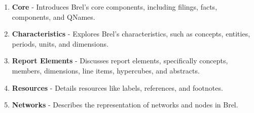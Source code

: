 \begin{enumerate}
    \item \textbf{Core} - Introduces Brel's core components, including filings, facts, components, and QNames.
    \item \textbf{Characteristics} - Explores Brel's characteristics, such as concepts, entities, periods, units, and dimensions.
    \item \textbf{Report Elements} - Discusses report elements, specifically concepts, members, dimensions, line items, hypercubes, and abstracts.
    \item \textbf{Resources} - Details resources like labels, references, and footnotes.
    \item \textbf{Networks} - Describes the representation of networks and nodes in Brel.
\end{enumerate}

